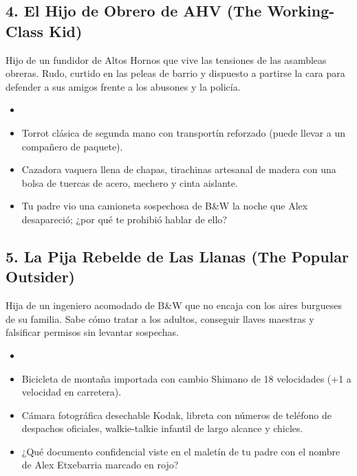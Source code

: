 \subsection{4. El Hijo de Obrero de AHV (The Working-Class Kid)}
Hijo de un fundidor de Altos Hornos que vive las tensiones de las asambleas obreras. Rudo, curtido en las peleas de barrio y dispuesto a partirse la cara para defender a sus amigos frente a los abusones y la policía.
\begin{itemize}
  \item {}      
  \item {} Torrot clásica de segunda mano con transportín reforzado (puede llevar a un compañero de paquete).
  \item {} Cazadora vaquera llena de chapas, tirachinas artesanal de madera con una bolsa de tuercas de acero, mechero y cinta aislante.
  \item {} Tu padre vio una camioneta sospechosa de B\&W la noche que Alex desapareció; ¿por qué te prohibió hablar de ello?
\end{itemize}

\subsection{5. La Pija Rebelde de Las Llanas (The Popular Outsider)}
Hija de un ingeniero acomodado de B\&W que no encaja con los aires burgueses de su familia. Sabe cómo tratar a los adultos, conseguir llaves maestras y falsificar permisos sin levantar sospechas.
\begin{itemize}
  \item {}      
  \item {} Bicicleta de montaña importada con cambio Shimano de 18 velocidades (+1 a velocidad en carretera).
  \item {} Cámara fotográfica desechable Kodak, libreta con números de teléfono de despachos oficiales, walkie-talkie infantil de largo alcance y chicles.
  \item {} ¿Qué documento confidencial viste en el maletín de tu padre con el nombre de Alex Etxebarria marcado en rojo?
\end{itemize}
